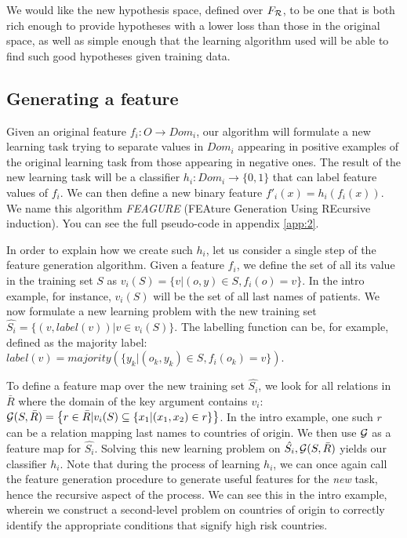 \documentclass[twoside,11pt]{article}
\theoremstyle{definition}
\begin{document}
We would like the new hypothesis space, defined over $F_{{\cal R}}$, to be one that is both rich enough to provide hypotheses with a lower loss than those in the original space, as well as simple enough that the learning algorithm used will be able to find such good hypotheses given training data.

\subsection{Generating a feature} \label{algorithm_section} %

Given an original feature $f_{i}:O\rightarrow Dom_i$, our algorithm will formulate a new learning task trying to separate values in $Dom_i$ appearing in positive examples of the original learning task from those appearing in negative ones.  The result of the new learning task will be a classifier
$h_{i}:Dom_{i}\rightarrow \{0,1\}$ that can label feature values of $f_{i}$. We can then define a new binary feature $f'_{i}(x)=h_{i}(f_{i}(x))$.
We name this algorithm \emph{FEAGURE} (FEAture Generation Using REcursive induction). You can see the full pseudo-code in appendix \ref{app:2}.

In order to explain how we create such $h_{i}$, let us consider a single step of the feature generation algorithm.
Given a feature $f_{i}$, we define the set of all its value in the training set $S$ as $v_i(S) = \{v | (o,y) \in S, f_{i}(o)=v\}$. In the intro example, for instance, $v_i(S)$ will be the set of all last names of patients.
We now formulate a new learning problem with the new training set
$\hat{S_i} = \{ (v, label(v)) | v \in v_i(S) \}$.
The labelling function can be, for example, defined as
the majority label: $label(v)=majority(\{y_k| \left(o_k,y_k \right) \in S, f_{i}(o_k)=v\})$.

To define a feature map over the new training set $\hat{S_{i}}$, we look for all relations in $\bar{R}$ where the domain of the key argument contains $v_i$:
${\cal G}(S,\bar{R}) = \left\{ r \in \bar{R} | v_i(S) \subseteq \{x_1 | (x_1,x_2) \in r\}\right\}$. In the intro example, one such $r$ can be a relation mapping last names to countries of origin. We then use ${\cal G}$ as a feature map for $\hat{S_i}$.
Solving this new learning problem on $\hat{S_i}, {\cal G}(S,\bar{R})$ yields our classifier $h_{i}$.
Note that during the process of learning $h_{i}$, we can once again call the feature generation procedure to generate useful features for the \emph{new} task, hence the recursive aspect of the process. We can see this in the intro example, wherein we construct a second-level problem on countries of origin to correctly identify the appropriate conditions that signify high risk countries.
\end{document}
